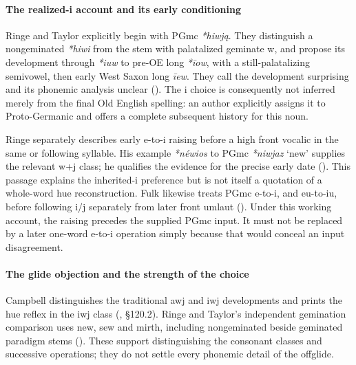 \documentclass[
  british,
  a4paper,
]{article}
\begin{document}
\paragraph{The realized-i account and its early
conditioning}\label{the-realized-i-account-and-its-early-conditioning}

Ringe and Taylor explicitly begin with PGmc \emph{*hiwją}. They
distinguish a nongeminated \emph{*hiwi} from the stem with palatalized
geminate w, and propose its development through \emph{*iuw} to pre-OE
long \emph{*īow}, with a still-palatalizing semivowel, then early West
Saxon long \emph{īew}. They call the development surprising and its
phonemic analysis unclear (). The i choice is consequently not inferred merely
from the final Old English spelling: an author explicitly assigns it to
Proto-Germanic and offers a complete subsequent history for this noun.

Ringe separately describes early e-to-i raising before a high front
vocalic in the same or following syllable. His example \emph{*néwios} to
PGmc \emph{*niwjaz} `new' supplies the relevant w+j class; he qualifies
the evidence for the precise early date (). This passage explains the inherited-i preference but is
not itself a quotation of a whole-word hue reconstruction. Fulk likewise
treats PGmc e-to-i, and eu-to-iu, before following i/j separately from
later front umlaut (). Under this
working account, the raising precedes the supplied PGmc input. It must
not be replaced by a later one-word e-to-i operation simply because that
would conceal an input disagreement.

\paragraph{The glide objection and the strength of the
choice}\label{the-glide-objection-and-the-strength-of-the-choice}

Campbell distinguishes the traditional awj and iwj developments and
prints the hue reflex in the iwj class
(, §120.2). Ringe and
Taylor's independent gemination comparison uses new, sew and mirth,
including nongeminated beside geminated paradigm stems
(). These
support distinguishing the consonant classes and successive operations;
they do not settle every phonemic detail of the offglide.
\end{document}
